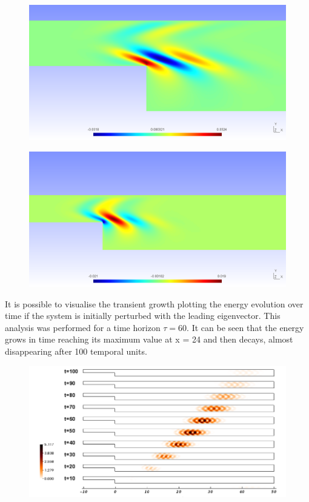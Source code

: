 \begin{figure}[!htbp]
\centering
 {\includegraphics[width=1 \textwidth]{Figures/bfs_eig_u}}
   \caption {}
\end{figure}

\begin{figure}[!htbp]
\centering
 {\includegraphics[width=1 \textwidth]{Figures/bfs_eig_v}}
    \caption {}
\end{figure}

It is possible to visualise the transient growth plotting the energy evolution over time if the system is initially perturbed with the leading eigenvector. This analysis was performed  for a time horizon $\tau= 60$. It can be seen that the energy grows in time reaching its maximum value at x = 24 and then decays, almost disappearing after 100 temporal units.


\begin{figure}[!htbp]
\centering
 {\includegraphics[width=1 \textwidth]{Figures/energy_bfs}}
   \caption {}
\end{figure}

